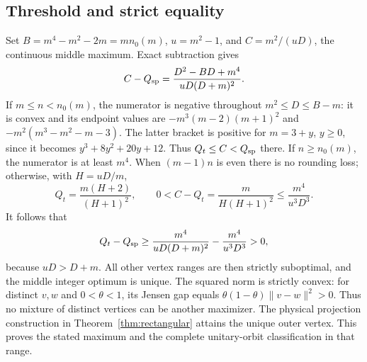 \subsection{Threshold and strict equality}
Set $B=m^4-m^2-2m=mn_0(m)$, $u=m^2-1$, and
$C=m^2/(uD)$, the continuous middle maximum. Exact subtraction gives
\[
 C-Q_{\rm sp}=\frac{D^2-BD+m^4}{uD(D+m)^2}.
\]
If $m\leq n<n_0(m)$, the numerator is negative throughout
$m^2\leq D\leq B-m$: it is convex and its endpoint values are
$-m^3(m-2)(m+1)^2$ and $-m^2(m^3-m^2-m-3)$.
The latter bracket is positive for $m=3+y$, $y\geq0$,
since it becomes $y^3+8y^2+20y+12$.
Thus $Q_t\leq C<Q_{\rm sp}$ there.
If $n\geq n_0(m)$, the numerator is at least $m^4$.
When $(m-1)n$ is even there is no rounding loss; otherwise,
with $H=uD/m$,
\[
 Q_t=\frac{m(H+2)}{(H+1)^2},\qquad
 0<C-Q_t=\frac{m}{H(H+1)^2}\leq\frac{m^4}{u^3D^3}.
\]
It follows that
\[
 Q_t-Q_{\rm sp}\geq
 \frac{m^4}{uD(D+m)^2}-\frac{m^4}{u^3D^3}>0,
\]
because $uD>D+m$.
All other vertex ranges are then strictly suboptimal, and the middle
integer optimum is unique. The squared norm is strictly convex:
for distinct $v,w$ and $0<\theta<1$, its Jensen gap equals
$\theta(1-\theta)\|v-w\|^2>0$.
Thus no mixture of distinct vertices can be another maximizer.
The physical projection construction in Theorem~\ref{thm:rectangular}
attains the unique outer vertex. This proves the stated maximum and
the complete unitary-orbit classification in that range.
